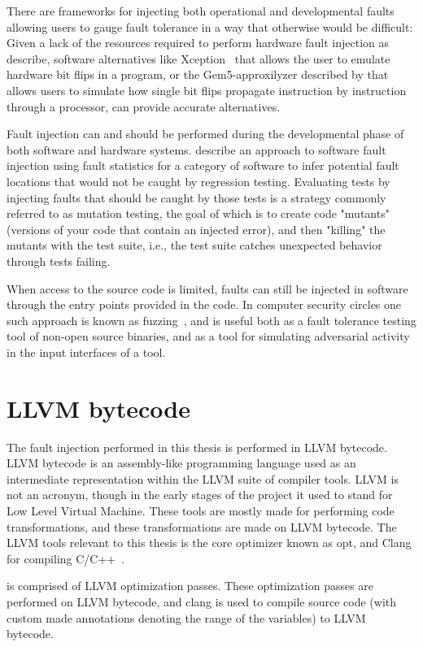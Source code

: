 There are frameworks for injecting both operational and developmental faults allowing users to gauge fault tolerance in a way that otherwise would be difficult: Given a lack of the resources required to perform hardware fault injection as \citet{arlat1993fault} describe, software alternatives like Xception~\citep{carreira1998xception} that allows the user to emulate hardware bit flips in a program, or the Gem5-approxilyzer described by \citet{venkatagiri2019gem5} that allows users to simulate how single bit flips propagate instruction by instruction through a processor, can provide accurate alternatives.

Fault injection can and should be performed during the developmental phase of both software and hardware systems. 
\citet{natella2012fault} describe an approach to software fault injection using fault statistics for a category of software to infer potential fault locations that would not be caught by regression testing. 
Evaluating tests by injecting faults that should be caught by those tests is a strategy commonly referred to as mutation testing, the goal of which is to create code "mutants" (versions of your code that contain an injected error), and then "killing" the mutants with the test suite, i.e.,  the test suite catches unexpected behavior through tests failing.

When access to the source code is limited, faults can still be injected in software through the entry points provided in the code. In computer security circles one such approach is known as fuzzing~\citep{miller1990empirical}, and is useful both as a fault tolerance testing tool of non-open source binaries, and as a tool for simulating adversarial activity in the input interfaces of a tool.

\section{LLVM bytecode}
The fault injection performed in this thesis is performed in LLVM bytecode.
LLVM bytecode is an assembly-like programming language used as an intermediate representation within the LLVM suite of compiler tools. LLVM is not an acronym, though in the early stages of the project it used to stand for Low Level Virtual Machine. These tools are mostly made for performing code transformations, and these transformations are made on LLVM bytecode. The LLVM tools relevant to this thesis is the core optimizer known as opt, and Clang for compiling C/C++~\citep{LLVM_homepage}.  %

\taffo{} is comprised of LLVM optimization passes. These optimization passes are performed on LLVM bytecode, and clang is used to compile source code (with custom made annotations denoting the range of the variables) to LLVM bytecode. %

